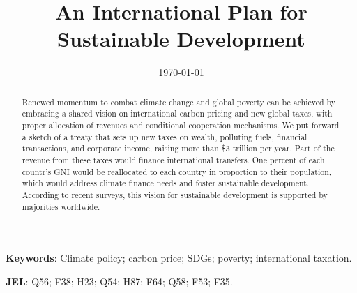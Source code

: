 \documentclass[12pt,english]{article}
\title{An International Plan for Sustainable Development
}
\date{\today{} %
}
\begin{document}
\maketitle

\clearpage
\begin{abstract}
  Renewed momentum to combat climate change and global poverty can be achieved by embracing a shared vision on international carbon pricing and new global taxes, with proper allocation of revenues and conditional cooperation mechanisms. We put forward a sketch of a treaty that sets up new taxes on wealth, polluting fuels, financial transactions, and corporate income, raising more than \$3 trillion per year. Part of the revenue from these taxes would finance international transfers. One percent of each countr's GNI would be reallocated to each country in proportion to their population, which would address climate finance needs and foster sustainable development. According to recent surveys, this vision for sustainable development is supported by majorities worldwide.
\end{abstract}

\textbf{Keywords}: Climate policy; carbon price; SDGs; poverty; international taxation.

\textbf{JEL}: Q56; F38; H23; Q54; H87; F64; Q58; F53; F35.
\end{document}
